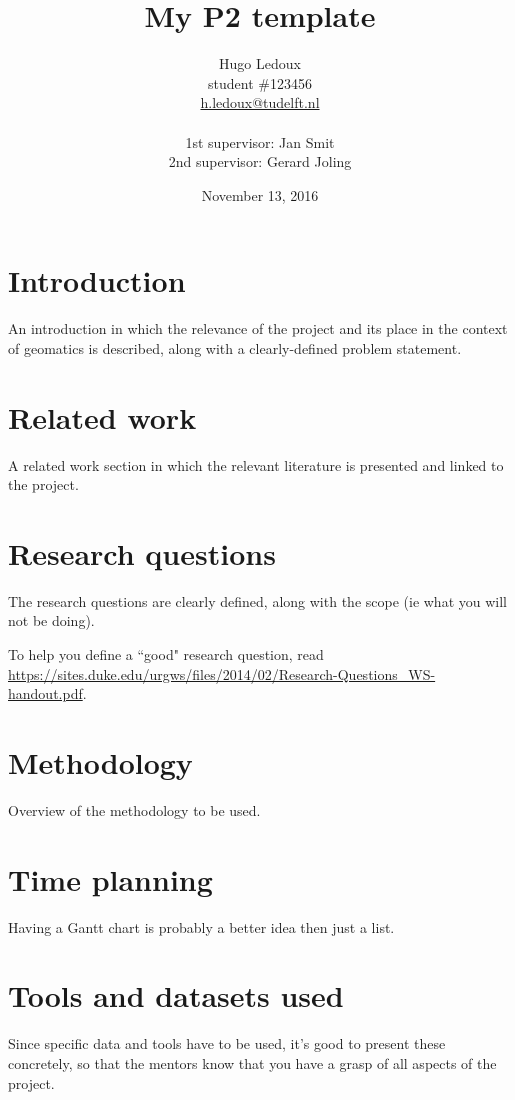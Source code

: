\documentclass[a4paper,11pt]{scrartcl}
\title{My P2 template}
\author{
  Hugo Ledoux\\
  student \#123456 \\
  \url{h.ledoux@tudelft.nl}\\
  \\
  1st supervisor: Jan Smit \\
  2nd supervisor: Gerard Joling \\
}
\date{November 13, 2016}
\begin{document}
\maketitle
\newpage

%
\section{Introduction}
An introduction in which the relevance of the project and its place in the context of geomatics is described, along with a clearly-defined problem statement.

%
\section{Related work}
A related work section in which the relevant literature is presented and linked to the project.

%
\section{Research questions}
The research questions are clearly defined, along with the scope (ie what you will not be doing).

To help you define a ``good" research question, read \url{https://sites.duke.edu/urgws/files/2014/02/Research-Questions_WS-handout.pdf}.



%
\section{Methodology}
Overview of the methodology to be used.

%
\section{Time planning}
Having a Gantt chart is probably a better idea then just a list.

%
\section{Tools and datasets used}
Since specific data and tools have to be used, it’s good to present these concretely, so that the mentors know that you have a grasp of all aspects of the project.



\end{document}
